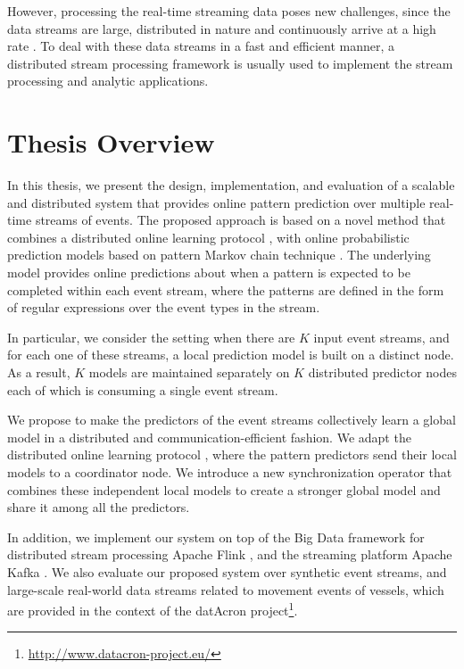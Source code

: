 \par However, processing the real-time streaming data poses new challenges, since the data streams are large, distributed in nature and continuously arrive at a high rate \cite{Babcock2002,Flouris2017}. To deal with these data streams in a fast and efficient manner, a distributed stream processing framework \cite{Spark,Flink,Storm} is usually used to implement the stream processing and analytic applications. 


\section{Thesis Overview}
\par In this thesis, we present the design, implementation, and evaluation of a scalable and distributed system that provides online pattern prediction over multiple real-time streams of events. The proposed approach is based on a novel method that combines a distributed online learning protocol \cite{kamp2014communication}, with online probabilistic prediction models based on pattern Markov chain technique \cite{alevizos2017event}. The underlying model provides online predictions about when a pattern is expected to be completed within each event stream, where the patterns are defined in the form of regular expressions over the event types in the stream.

\par In particular, we consider the setting when there are \emph{$K$} input event streams, and for each one of these streams, a local prediction model is built on a distinct node. As a result, \emph{$K$} models are maintained separately on \emph{$K$} distributed predictor nodes each of which is consuming a single event stream.


 \par We propose to make the predictors of the event streams collectively learn a global model in a distributed and communication-efficient fashion. We adapt the distributed online learning protocol \cite{kamp2014communication}, where the pattern predictors \cite{alevizos2017event} send their local models to a coordinator node. We introduce a new synchronization operator that combines these independent local models to create a stronger global model and share it among all the predictors.
  

\par In addition, we  implement our system on top of the Big Data framework for distributed stream processing Apache Flink \cite{Flink}, and the streaming platform Apache Kafka \cite{Kafka}. We also evaluate our proposed system over synthetic event streams, and large-scale real-world data streams related to movement events of vessels, which are provided in the context of the datAcron project\footnote{\url{http://www.datacron-project.eu/}}.\\

